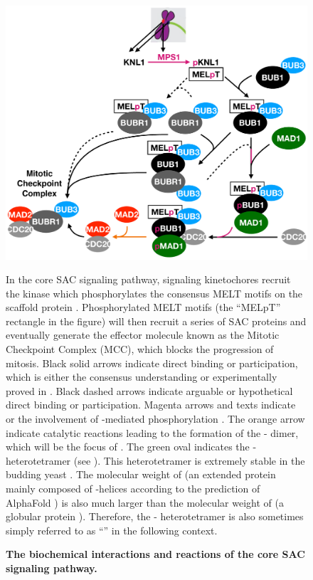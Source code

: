 \begin{figure}
    \centering
    \includegraphics[width=\textwidth]{chapters/figures/CoreSAC.pdf}
    \caption{\textbf{The biochemical interactions and reactions of the core SAC signaling pathway.}}
    \noindent\justifying In the core SAC signaling pathway, signaling kinetochores recruit the kinase  which phosphorylates the consensus MELT motifs on the scaffold protein . Phosphorylated MELT motifs (the ``MELpT'' rectangle in the figure) will then recruit a series of SAC proteins and eventually generate the effector molecule known as the Mitotic Checkpoint Complex (MCC), which blocks the progression of mitosis. Black solid arrows indicate direct binding or participation, which is either the consensus understanding \cite{MPS1Localization_Ji, MPS1Localization_Hiruma, RecombinantKNL1, MELTActivity, BubBiochem, BubR1TwoPools, BUB1CD1-MAD1CStructure, Faesen2017, BUB1-CDC20-MAD1, Tripartite} or experimentally proved in . Black dashed arrows indicate arguable \cite{BubBiochem, BubR1TwoPools} or hypothetical direct binding or participation. Magenta arrows and texts indicate  or the involvement of -mediated phosphorylation \cite{Ji2017eLife}. The orange arrow indicate catalytic reactions leading to the formation of the - dimer, which will be the focus of . The green  oval indicates the - heterotetramer (see ). This heterotetramer is extremely stable in the budding yeast \cite{StableHeterotetramer}. The molecular weight of  (an extended protein mainly composed of \textalpha{}-helices according to the prediction of AlphaFold \cite{AlphaFold}) is also much larger than the molecular weight of  (a globular protein \cite{Structure1GO4}). Therefore, the - heterotetramer is also sometimes simply referred to as ``'' in the following context.
    \label{CoreSAC}
\end{figure}

